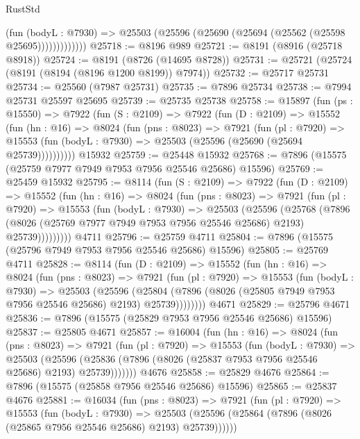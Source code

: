 \begin{lexlean}{RustStd}
\begin{coremodule}
                  (fun (bodyL : @7930) =>
                  @25503 (@25596 (@25690 (@25694 (@25562 (@25598 @25695)))))))))))))
@25718 := @8196 @989
@25721 := @8191 (@8916 (@25718 @8918))
@25724 := @8191 (@8726 (@14695 @8728))
@25731 := @25721 (@25724 (@8191 (@8194 (@8196 @1200 @8199)) @7974))
@25732 := @25717 @25731
@25734 := @25560 (@7987 @25731)
@25735 := @7896 @25734
@25738 := @7994 @25731 @25597 @25695
@25739 := @25735 @25738
@25758 := @15897
    (fun (ps : @15550) =>
    @7922
      (fun (S : @2109) =>
      @7922
        (fun (D : @2109) =>
        @15552
          (fun (hn : @16) =>
          @8024
            (fun (pns : @8023) =>
            @7921
              (fun (pl : @7920) =>
              @15553 (fun (bodyL : @7930) => @25503 (@25596 (@25690 (@25694 @25739))))))))))
    @15932
@25759 := @25448 @15932
@25768 := @7896 (@15575 (@25759 @7977 @7949 @7953 @7956 @25546 @25686) @15596)
@25769 := @25459 @15932
@25795 := @8114
    (fun (S : @2109) =>
    @7922
      (fun (D : @2109) =>
      @15552
        (fun (hn : @16) =>
        @8024
          (fun (pns : @8023) =>
          @7921
            (fun (pl : @7920) =>
            @15553
              (fun (bodyL : @7930) =>
              @25503
                (@25596
                  (@25768
                    (@7896
                      (@8026 (@25769 @7977 @7949 @7953 @7956 @25546 @25686) @2193)
                      @25739)))))))))
    @4711
@25796 := @25759 @4711
@25804 := @7896 (@15575 (@25796 @7949 @7953 @7956 @25546 @25686) @15596)
@25805 := @25769 @4711
@25828 := @8114
    (fun (D : @2109) =>
    @15552
      (fun (hn : @16) =>
      @8024
        (fun (pns : @8023) =>
        @7921
          (fun (pl : @7920) =>
          @15553
            (fun (bodyL : @7930) =>
            @25503
              (@25596
                (@25804 (@7896 (@8026 (@25805 @7949 @7953 @7956 @25546 @25686) @2193) @25739))))))))
    @4671
@25829 := @25796 @4671
@25836 := @7896 (@15575 (@25829 @7953 @7956 @25546 @25686) @15596)
@25837 := @25805 @4671
@25857 := @16004
    (fun (hn : @16) =>
    @8024
      (fun (pns : @8023) =>
      @7921
        (fun (pl : @7920) =>
        @15553
          (fun (bodyL : @7930) =>
          @25503
            (@25596 (@25836 (@7896 (@8026 (@25837 @7953 @7956 @25546 @25686) @2193) @25739)))))))
    @4676
@25858 := @25829 @4676
@25864 := @7896 (@15575 (@25858 @7956 @25546 @25686) @15596)
@25865 := @25837 @4676
@25881 := @16034
    (fun (pns : @8023) =>
    @7921
      (fun (pl : @7920) =>
      @15553
        (fun (bodyL : @7930) =>
        @25503 (@25596 (@25864 (@7896 (@8026 (@25865 @7956 @25546 @25686) @2193) @25739))))))

\end{coremodule}
\end{lexlean}
